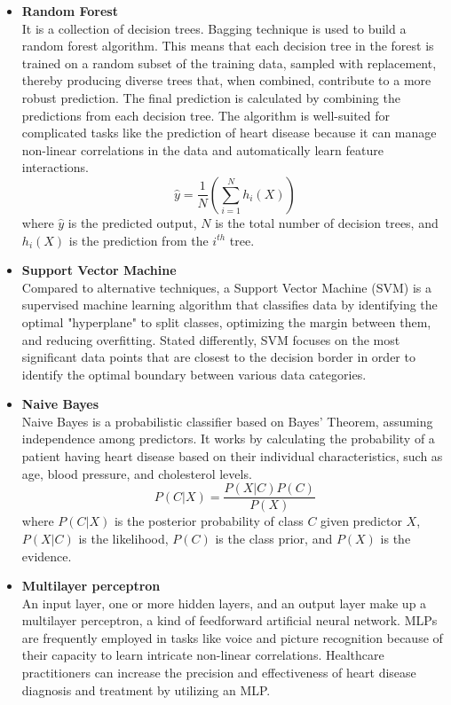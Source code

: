 \documentclass[12pt]{article}
\begin{document}
\begin{itemize}
\item \textbf{Random Forest} \\
It is a collection of decision trees. Bagging technique is used to build a random forest algorithm. This means that each decision tree in the forest is trained on a random subset of the training data, sampled with replacement, thereby producing diverse trees that, when combined, contribute to a more robust prediction. The final prediction is calculated by combining the predictions from each decision tree. The algorithm is well-suited for complicated tasks like the prediction of heart disease because it can manage non-linear correlations in the data and automatically learn feature interactions. 
\begin{equation}
\hat{y} = \frac{1}{N}\left(\sum_{i=1}^{N} h_i(X)\right)
\end{equation}
\noindent
where \( \hat{y} \) is the predicted output, \( N \) is the total number of decision trees, and \( h_i(X) \) is the prediction from the \( i^{th} \) tree.


\item \textbf{Support Vector Machine} \\
Compared to alternative techniques, a Support Vector Machine (SVM) is a supervised machine learning algorithm that classifies data by identifying the optimal "hyperplane" to split classes, optimizing the margin between them, and reducing overfitting. Stated differently, SVM focuses on the most significant data points that are closest to the decision border in order to identify the optimal boundary between various data categories.



\item \textbf{Naive Bayes} \\
Naive Bayes is a probabilistic classifier based on Bayes' Theorem, assuming independence among predictors. It works by calculating the probability of a patient having heart disease based on their individual characteristics, such as age, blood pressure, and cholesterol levels.
\begin{equation}
P(C|X) = \frac{P(X|C)P(C)}{P(X)}
\end{equation}
\noindent
where \( P(C|X) \) is the posterior probability of class \( C \) given predictor \( X \), \( P(X|C) \) is the likelihood, \( P(C) \) is the class prior, and \( P(X) \) is the evidence.



\item \textbf{Multilayer perceptron} \\
An input layer, one or more hidden layers, and an output layer make up a multilayer perceptron, a kind of feedforward artificial neural network. MLPs are frequently employed in tasks like voice and picture recognition because of their capacity to learn intricate non-linear correlations. Healthcare practitioners can increase the precision and effectiveness of heart disease diagnosis and treatment by utilizing an MLP.



\end{itemize}
\end{document}
